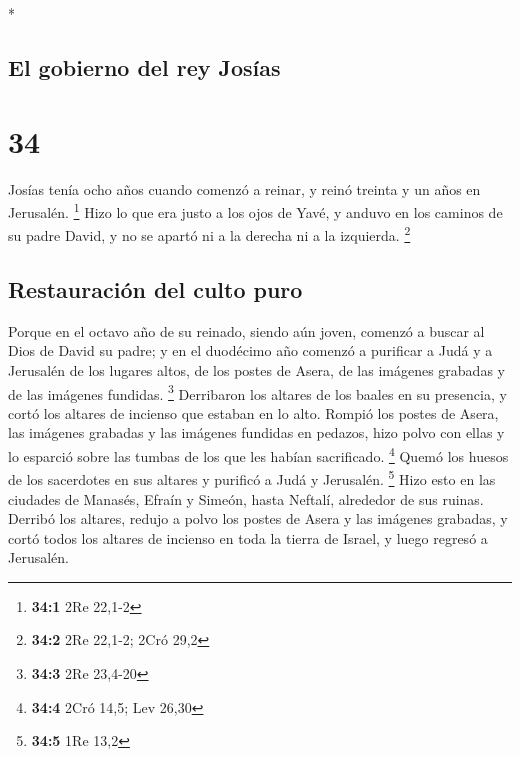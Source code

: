 \begin{paracol}{2}
\begin{otherlanguage}{english}
\end{otherlanguage}

\switchcolumn[0]*

\hypertarget{el-gobierno-del-rey-josuxedas}{%
\subsection{El gobierno del rey
Josías}\label{el-gobierno-del-rey-josuxedas}}

\hypertarget{section-66}{%
\section{34}\label{section-66}}

 Josías tenía ocho años cuando comenzó a reinar, y reinó
treinta y un años en Jerusalén. \footnote{\textbf{34:1} 2Re 22,1-2}
 Hizo lo que era justo a los ojos de Yavé, y anduvo en los
caminos de su padre David, y no se apartó ni a la derecha ni a la
izquierda. \footnote{\textbf{34:2} 2Re 22,1-2; 2Cró 29,2}

\hypertarget{restauraciuxf3n-del-culto-puro}{%
\subsection{Restauración del culto
puro}\label{restauraciuxf3n-del-culto-puro}}

 Porque en el octavo año de su reinado, siendo aún joven,
comenzó a buscar al Dios de David su padre; y en el duodécimo año
comenzó a purificar a Judá y a Jerusalén de los lugares altos, de los
postes de Asera, de las imágenes grabadas y de las imágenes fundidas.
\footnote{\textbf{34:3} 2Re 23,4-20}  Derribaron los
altares de los baales en su presencia, y cortó los altares de incienso
que estaban en lo alto. Rompió los postes de Asera, las imágenes
grabadas y las imágenes fundidas en pedazos, hizo polvo con ellas y lo
esparció sobre las tumbas de los que les habían sacrificado. \footnote{\textbf{34:4}
  2Cró 14,5; Lev 26,30}  Quemó los huesos de los
sacerdotes en sus altares y purificó a Judá y Jerusalén. \footnote{\textbf{34:5}
  1Re 13,2}  Hizo esto en las ciudades de Manasés, Efraín
y Simeón, hasta Neftalí, alrededor de sus ruinas.  Derribó
los altares, redujo a polvo los postes de Asera y las imágenes grabadas,
y cortó todos los altares de incienso en toda la tierra de Israel, y
luego regresó a Jerusalén.

\hypertarget{explicar-los-procedimientos-que-se-siguen-para-restaurar-y-mantener-el-templo}{%
}
\end{paracol}
